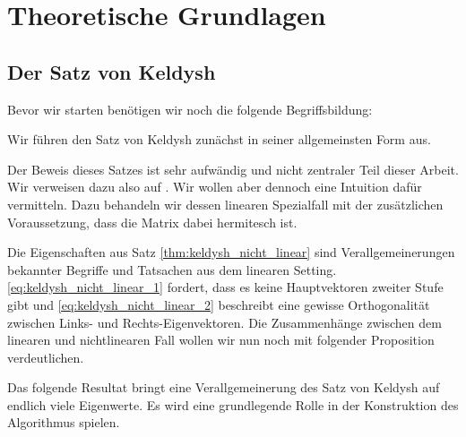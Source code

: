 \chapter{Theoretische Grundlagen}

\section{Der Satz von Keldysh}

Bevor wir starten benötigen wir noch die folgende Begriffsbildung:




Wir führen den Satz von Keldysh zunächst in seiner allgemeinsten Form aus.



Der Beweis dieses Satzes ist sehr aufwändig und nicht zentraler Teil dieser Arbeit.
Wir verweisen dazu also auf \cite{BEYN20123839}.
Wir wollen aber dennoch eine Intuition dafür vermitteln.
Dazu behandeln wir dessen linearen Spezialfall mit der zusätzlichen Voraussetzung, dass die Matrix dabei hermitesch ist.



Die Eigenschaften aus Satz \ref{thm:keldysh_nicht_linear} sind Verallgemeinerungen bekannter Begriffe und Tatsachen aus dem linearen Setting.
\eqref{eq:keldysh_nicht_linear_1} fordert, dass es keine Hauptvektoren zweiter Stufe gibt und \eqref{eq:keldysh_nicht_linear_2} beschreibt eine gewisse Orthogonalität zwischen Links- und Rechts-Eigenvektoren.
Die Zusammenhänge zwischen dem linearen und nichtlinearen Fall wollen wir nun noch mit folgender Proposition verdeutlichen.





% 

% 
% 

Das folgende Resultat bringt eine Verallgemeinerung des Satz von Keldysh
auf endlich viele Eigenwerte.
Es wird eine grundlegende Rolle in der Konstruktion des Algorithmus spielen.



